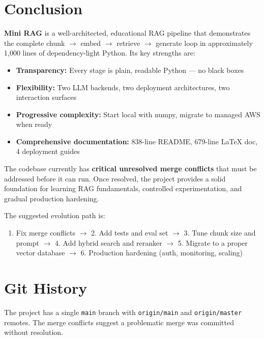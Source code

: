 \documentclass[11pt,a4paper]{paper}
\begin{document}
\section{Conclusion}
\label{sec:conclusion}

\textbf{Mini RAG} is a well-architected, educational RAG pipeline that demonstrates the complete chunk $\rightarrow$ embed $\rightarrow$ retrieve $\rightarrow$ generate loop in approximately 1,000 lines of dependency-light Python. Its key strengths are:

\begin{itemize}
  \item \textbf{Transparency:} Every stage is plain, readable Python — no black boxes
  \item \textbf{Flexibility:} Two LLM backends, two deployment architectures, two interaction surfaces
  \item \textbf{Progressive complexity:} Start local with numpy, migrate to managed AWS when ready
  \item \textbf{Comprehensive documentation:} 838-line README, 679-line LaTeX doc, 4 deployment guides
\end{itemize}

The codebase currently has \textbf{critical unresolved merge conflicts} that must be addressed before it can run. Once resolved, the project provides a solid foundation for learning RAG fundamentals, controlled experimentation, and gradual production hardening.

The suggested evolution path is:
\begin{enumerate}
  \item Fix merge conflicts $\rightarrow$ 2. Add tests and eval set $\rightarrow$ 3. Tune chunk size and prompt $\rightarrow$ 4. Add hybrid search and reranker $\rightarrow$ 5. Migrate to a proper vector database $\rightarrow$ 6. Production hardening (auth, monitoring, scaling)
\end{enumerate}

\appendix

\section{Git History}

The project has a single \texttt{main} branch with \texttt{origin/main} and \texttt{origin/master} remotes. The merge conflicts suggest a problematic merge was committed without resolution.
\end{document}
